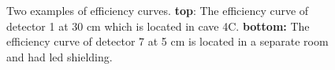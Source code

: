 \begin{figure}%
    \centering
    
    \caption{Two examples of efficiency curves. \textbf{top}: The efficiency curve of detector 1 at 30 cm which is located in cave 4C. \textbf{bottom:} The efficiency curve of detector 7 at 5 cm is located in a separate room and had led shielding. }%
    \label{fig:efficiency_curves}%
\end{figure}


